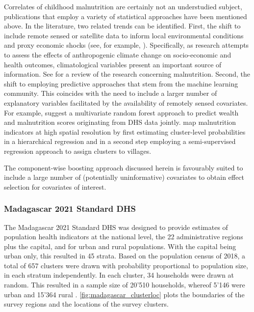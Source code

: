 Correlates of childhood malnutrition are certainly not an understudied subject, publications that employ a variety of statistical approaches have been mentioned above. In the literature, two related trends can be identified. First, the shift to include remote sensed or satellite data to inform local environmental conditions and proxy economic shocks (see, for example, \textcite{graceConflictClimateFactors2022, vandermerweClimateChangeChild2022, seilerModellingChildrenAnthropometric2021}). Specifically, as research attempts to assess the effects of anthropogenic climate change on socio-economic and health outcomes, climatological variables present an important source of information. See \textcite{phalkeySystematicReviewCurrent2015} for a review of the research concerning malnutrition. Second, the shift to employing predictive approaches that stem from the machine learning community. This coincides with the need to include a larger number of explanatory variables facilitated by the availability of remotely sensed covariates. For example, \textcite{browneMultivariateRandomForest2021} suggest a multivariate random forest approach to predict wealth and malnutrition scores originating from DHS data jointly. \textcite{kimPrecisionMappingChild2021} map malnutrition indicators at high spatial resolution by first estimating cluster-level probabilities in a hierarchical regression and in a second step employing a semi-supervised regression approach to assign clusters to villages.

The component-wise boosting approach discussed herein is favourably suited to include a large number of (potentially uninformative) covariates to obtain effect selection for covariates of interest.


\subsubsection*{Madagascar 2021 Standard DHS}

The Madagascar 2021 Standard DHS was designed to provide estimates of population health indicators at the national level, the 22 administrative regions plus the capital, and for urban and rural populations. With the capital being urban only, this resulted in 45 strata. Based on the population census of 2018, a total of 657 clusters were drawn with probability proportional to population size, in each stratum independently. In each cluster, 34 households were drawn at random. This resulted in a sample size of 20'510 households, whereof 5'146 were urban and 15'364 rural \autocite{institutnationaldelastatistiqueinstatEnqueteDemographiqueSante2022}. \autoref{fig:madagascar_clusterloc} plots the boundaries of the survey regions and the locations of the survey clusters. 

